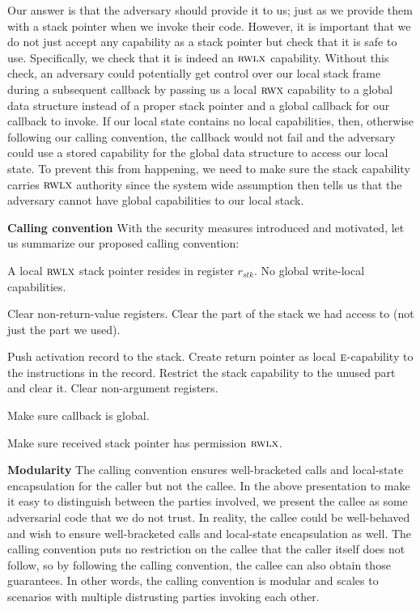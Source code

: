 \documentclass[format=acmsmall, review=true, screen=true]{acmart}
\newcommand{\var}[1]{\mathit{#1}}
\newcommand{\stk}{\var{stk}}
\newcommand{\plainperm}[1]{\textsc{#1}}
\newcommand{\entry}{\plainperm{e}}
\newcommand{\rwx}{\plainperm{rwx}}
\newcommand{\rwlx}{\plainperm{rwlx}}
\newenvironment{toplas}{}{}
\newcommand{\itoplassug}[1]{}
\begin{document}
Our answer is that the adversary should provide it to us; just as we provide
them with a stack pointer when we invoke their code. However, it is important
that we do not just accept any capability as a stack pointer but check that it
is safe to use. Specifically, we check that it is indeed an $\rwlx$ capability. Without
this check, an adversary could potentially get control over our local stack
frame during a subsequent callback by passing us a local $\rwx$ capability to a global data
structure instead of a proper stack pointer
and a global callback for our callback to invoke. If our local state contains no
local capabilities, then, otherwise following our calling convention, the callback would
not fail and the adversary could use a stored capability for the global data
structure to access our local state. To prevent this from happening, we need to
make sure the stack capability carries $\rwlx$ authority since the system wide assumption then
tells us that the adversary cannot have global capabilities to our local stack.

\textbf{Calling convention} With the security measures introduced and motivated,
let us summarize our proposed calling convention:
\begin{description}[font=\normalfont\itshape]
\item[At program start-up] A
local $\rwlx$ stack pointer resides in register $r_\stk$. No global write-local capabilities.
\item[Before returning to the adversary] Clear non-return-value
registers. Clear the part of the stack we had access to (not just the part we used).
\item[Before invoking the adversary] Push activation record to the
stack. Create return pointer as local $\entry$-capability to the instructions in
the record.  Restrict the stack capability to the unused part and clear
it. Clear non-argument registers.
\item[Before invoking an adversary callback] Make sure callback is global.
  \item[When invoked by an adversary] Make sure received stack pointer has permission $\rwlx$.
\end{description}

\begin{toplas}
  \textbf{Modularity} The calling convention ensures well-bracketed calls and
  local-state encapsulation for the caller but not the callee. In the above
  presentation to make it easy to distinguish between the parties involved, we
  present the callee as some adversarial code that we do not trust. In reality,
  the callee could be well-behaved and wish to ensure well-bracketed calls and
  local-state encapsulation as well. The calling convention puts no restriction
  on the callee that the caller itself does not follow, so by following the
  calling convention, the callee can also obtain those guarantees. In other
  words, the calling convention is modular and scales to scenarios with multiple
  distrusting parties invoking each other.
\end{toplas}
\end{document}
